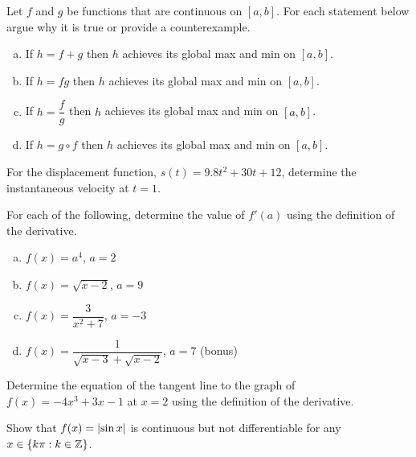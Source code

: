 \question Let $f$ and $g$ be functions that are continuous on $[a,b]$.
For each statement below argue why it is true or provide a counterexample.
\begin{enumerate}[(a)]
  \item If $h=f+g$ then $h$ achieves its global max and min on $[a,b]$.
  \item If $h=fg$ then $h$ achieves its global max and min on $[a,b]$.
  \item If $h=\dfrac{f}{g}$ then $h$ achieves its global max and min on $[a,b]$.
  \item If $h=g\circ f$ then $h$ achieves its global max and min on $[a,b]$.
\end{enumerate}

\question For the displacement function, $s(t)=9.8t^2+30t+12$, determine the instantaneous velocity at $t=1$.

\question For each of the following, determine the value of $f'(a)$ using the definition of the derivative.
\begin{enumerate}[(a)]
  \item $f(x) = a^4$, $a=2$
  \item $f(x) = \sqrt{x-2}$, $a=9$
  \item $f(x) = \dfrac{3}{x^2+7}$, $a=-3$
  \item $f(x) = \dfrac{1}{\sqrt{x-3}+\sqrt{x-2}}$, $a=7$ (bonus)
\end{enumerate}

\question Determine the equation of the tangent line to the graph of $f(x)=-4x^3+3x-1$ at $x=2$ using the definition of the derivative.

\question Show that $f(x) = \abs{\sin x}$ is continuous but not differentiable for any $x \in \{k\pi : k \in \mathbb{Z}\}$.

